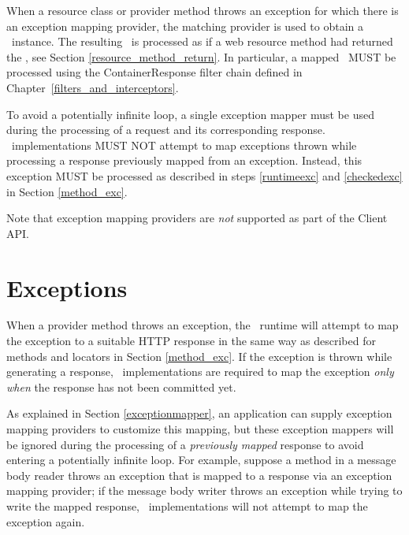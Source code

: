 When a resource class or provider method throws an exception for which there is an exception mapping provider, the matching provider is used to obtain a \Response\ instance. The resulting \Response\ is processed as if a web resource method had returned the \Response, see Section \ref{resource_method_return}. In particular, a mapped \Response\ MUST be processed using the ContainerResponse filter chain defined in  Chapter~\ref{filters_and_interceptors}.

To avoid a potentially infinite loop, a single exception mapper must be used during the processing of a request and its corresponding response. \jaxrs\ implementations MUST NOT attempt to map exceptions thrown while processing a response previously mapped from an exception. Instead, this exception MUST be processed as described in steps \ref{runtimeexc} and \ref{checkedexc} in Section \ref{method_exc}.

Note that exception mapping providers are {\em not} supported as part of the Client API.

\section{Exceptions}
\label{exceptions_providers}

When a provider method throws an exception, the \jaxrs\ runtime will attempt to map the exception to a suitable HTTP response in the same way as described for methods and locators in Section \ref{method_exc}. If the exception is thrown
while generating a response, \jaxrs\ implementations are required to map the exception {\em only when} the response has not been committed yet.

As explained in Section \ref{exceptionmapper}, an application can supply exception mapping providers to customize this mapping, but these exception mappers will be ignored during the processing of a {\em previously mapped} response to avoid entering a potentially infinite loop. For example, suppose a method in a message body reader throws an exception that is mapped to a response via an exception mapping provider; if the message body writer throws an exception while trying to write the mapped response, \jaxrs\ implementations will not attempt to map the exception again.






